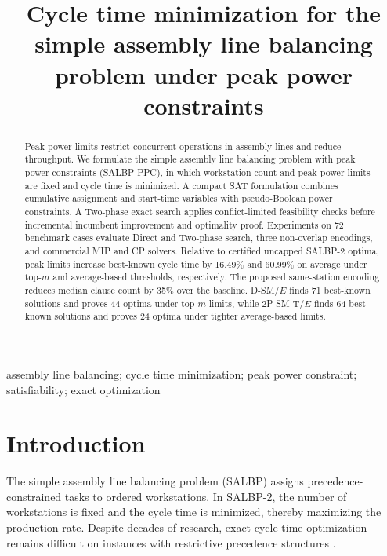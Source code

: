 \documentclass[]{interact}
\theoremstyle{plain}
\theoremstyle{definition}
\theoremstyle{remark}
\newcommand{\Problem}{SALBP-PPC}
\begin{document}

\title{Cycle time minimization for the simple assembly line balancing problem under peak power constraints}

\author{
}

\maketitle
\enlargethispage{6pt}

\begin{abstract}
Peak power limits restrict concurrent operations in assembly lines and reduce throughput. We formulate the simple assembly line balancing problem with peak power constraints (\Problem), in which workstation count and peak power limits are fixed and cycle time is minimized. A compact SAT formulation combines cumulative assignment and start-time variables with pseudo-Boolean power constraints. A Two-phase exact search applies conflict-limited feasibility checks before incremental incumbent improvement and optimality proof. Experiments on 72 benchmark cases evaluate Direct and Two-phase search, three non-overlap encodings, and commercial MIP and CP solvers. Relative to certified uncapped SALBP-2 optima, peak limits increase best-known cycle time by 16.49\% and 60.99\% on average under top-$m$ and average-based thresholds, respectively. The proposed same-station encoding reduces median clause count by 35\% over the baseline. D-SM/$E$ finds 71 best-known solutions and proves 44 optima under top-$m$ limits, while 2P-SM-T/$E$ finds 64 best-known solutions and proves 24 optima under tighter average-based limits.
\end{abstract}

\begin{keywords}
assembly line balancing; cycle time minimization; peak power constraint; satisfiability; exact optimization
\end{keywords}

\section{Introduction}

The simple assembly line balancing problem (SALBP) assigns precedence-constrained tasks to ordered workstations. In SALBP-2, the number of workstations is fixed and the cycle time is minimized, thereby maximizing the production rate. Despite decades of research, exact cycle time optimization remains difficult on instances with restrictive precedence structures \citep{Scholl2006,Li2021Enhanced,Alvarez2024BBR}.
\end{document}
